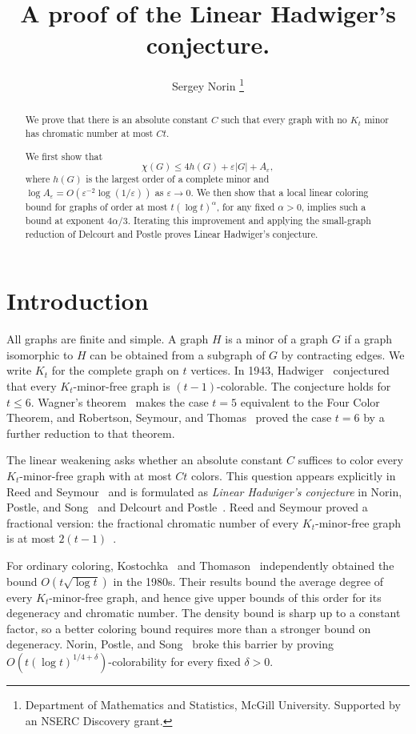 \documentclass[11pt]{article}
\title{A proof of the Linear Hadwiger's conjecture. }
\author{ Sergey Norin \thanks{Department of Mathematics and Statistics, McGill University. Supported by an NSERC Discovery grant.}}
\date{}
\begin{document}
\maketitle

\begin{abstract}
We prove that there is an absolute constant $C$ such that every graph
with no $K_t$ minor has chromatic number at most $Ct$. 

We first show that $$\chi(G)\le4h(G)+\varepsilon|G|+A_\varepsilon,$$
where $h(G)$ is the largest order of a complete minor and
$\log A_\varepsilon=O(\varepsilon^{-2}\log(1/\varepsilon))$ as
$\varepsilon\to0$. We then show that a local linear coloring bound
for graphs of order at most $t(\log t)^\alpha$, for any fixed
$\alpha>0$, implies such a bound at exponent $4\alpha/3$.
Iterating this improvement and applying the small-graph
reduction of Delcourt and Postle proves Linear Hadwiger's conjecture.
\end{abstract}

\section{Introduction}

All graphs are finite and simple. A graph $H$ is a minor of a graph
$G$ if a graph isomorphic to $H$ can be obtained from a subgraph of
$G$ by contracting edges. We write $K_t$ for the complete graph on
$t$ vertices. In 1943, Hadwiger~\cite{Had} conjectured that every
$K_t$-minor-free graph is $(t-1)$-colorable. The conjecture holds for
$t\le6$. Wagner's theorem~\cite{Wag} makes the case $t=5$ equivalent
to the Four Color Theorem, and Robertson, Seymour, and
Thomas~\cite{RST} proved the case $t=6$ by a further reduction to
that theorem.

The linear weakening asks whether an absolute constant $C$ suffices
to color every $K_t$-minor-free graph with at most $Ct$ colors.
This question appears explicitly in Reed and Seymour~\cite[p.~148]{RS}
and is formulated as \emph{Linear Hadwiger's conjecture} in
Norin, Postle, and Song~\cite[Conjecture~1.2]{NPS} and Delcourt and
Postle~\cite[Conjecture~1.2]{DP}. Reed and Seymour proved a fractional
version: the fractional chromatic number of every $K_t$-minor-free
graph is at most $2(t-1)$~\cite[Theorem~1.3]{RS}.

For ordinary coloring, Kostochka~\cite{Kos} and Thomason~\cite{Tho}
independently obtained the bound $O(t\sqrt{\log t})$ in the 1980s.
Their results bound the average degree of every $K_t$-minor-free
graph, and hence give upper bounds of this order for its degeneracy
and chromatic number. The density bound is sharp up to a constant
factor, so a better coloring bound requires more than a stronger
bound on degeneracy. Norin, Postle, and Song~\cite[Theorem~1.4]{NPS}
broke this barrier by proving $O(t(\log t)^{1/4+\delta})$-colorability
for every fixed $\delta>0$.
\end{document}
